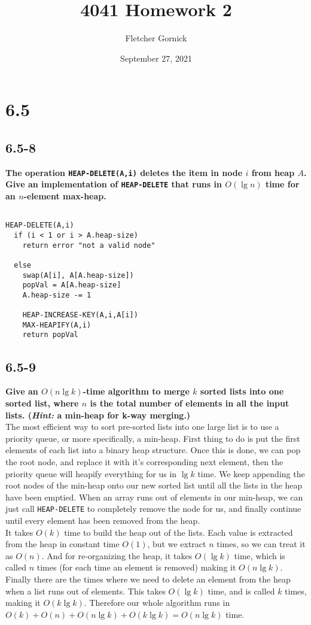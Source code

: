 \documentclass[11pt]{article}
\title{4041 Homework 2}
\author{Fletcher Gornick}
\date{September 27, 2021}
\begin{document}
 \maketitle 
 \section*{6.5}

 \subsection*{6.5-8}
 \textbf{The operation \texttt{HEAP-DELETE(A,i)} deletes the item in node $i$ from heap $A$. 
 Give an implementation of \texttt{HEAP-DELETE} that runs in $O(\lg n)$ time for an $n$-element 
 max-heap.}
 \begin{verbatim}

HEAP-DELETE(A,i)
  if (i < 1 or i > A.heap-size)
    return error "not a valid node"

  else
    swap(A[i], A[A.heap-size])
    popVal = A[A.heap-size]
    A.heap-size -= 1

    HEAP-INCREASE-KEY(A,i,A[i])
    MAX-HEAPIFY(A,i)
    return popVal
 \end{verbatim}
\newpage

 \subsection*{6.5-9}
 \textbf{Give an $O(n \lg k)$-time algorithm to merge $k$ sorted lists into one sorted list, 
 where $n$ is the total number of elements in all the input lists. (\textit{Hint:} a min-heap 
 for k-way merging.)} \\

 The most efficient way to sort pre-sorted lists into one large list is to use a priority queue, 
 or more specifically, a min-heap.  First thing to do is put the first elements of each list into 
 a binary heap structure.  Once this is done, we can pop the root node, and replace it with it's 
 corresponding next element, then the priority queue will heapify everything for us in $\lg k$ 
 time.  We keep appending the root nodes of the min-heap onto our new sorted list until all the 
 lists in the heap have been emptied.  When an array runs out of elements in our min-heap, we can 
 just call \texttt{HEAP-DELETE} to completely remove the node for us, and finally continue until 
 every element has been removed from the heap. \\

 It takes $O(k)$ time to build the heap out of the lists.  Each value is extracted from the heap 
 in constant time $O(1)$, but we extract $n$ times, so we can treat it as $O(n)$.  And for 
 re-organizing the heap, it takes $O(\lg k)$ time, which is called $n$ times (for each time an
 element is removed) making it $O(n \lg k)$.  Finally there are the times where we need to delete 
 an element from the heap when a list runs out of elements.  This takes $O(\lg k)$ time, and is 
 called $k$ times, making it $O(k \lg k)$.  Therefore our whole algorithm runs in 
 $O(k) + O(n) + O(n \lg k) + O(k \lg k) = O(n \lg k)$ time. \\
\end{document}
